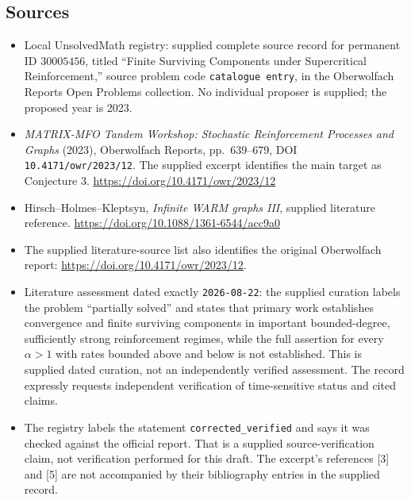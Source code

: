 \documentclass[11pt]{article}
\begin{document}
\subsection{Sources}
\begin{itemize}
\item Local UnsolvedMath registry: supplied complete source record for permanent ID \(30005456\), titled ``Finite Surviving Components under Supercritical Reinforcement,'' source problem code \texttt{catalogue entry}, in the Oberwolfach Reports Open Problems collection. No individual proposer is supplied; the proposed year is 2023.
\item \emph{MATRIX-MFO Tandem Workshop: Stochastic Reinforcement Processes and Graphs} (2023), Oberwolfach Reports, pp.\ 639--679, DOI \texttt{10.4171/owr/2023/12}. The supplied excerpt identifies the main target as Conjecture 3. \url{https://doi.org/10.4171/owr/2023/12}
\item Hirsch--Holmes--Kleptsyn, \emph{Infinite WARM graphs III}, supplied literature reference. \url{https://doi.org/10.1088/1361-6544/acc9a0}
\item The supplied literature-source list also identifies the original Oberwolfach report: \url{https://doi.org/10.4171/owr/2023/12}.
\item Literature assessment dated exactly \texttt{2026-08-22}: the supplied curation labels the problem ``partially solved'' and states that primary work establishes convergence and finite surviving components in important bounded-degree, sufficiently strong reinforcement regimes, while the full assertion for every \(\alpha>1\) with rates bounded above and below is not established. This is supplied dated curation, not an independently verified assessment. The record expressly requests independent verification of time-sensitive status and cited claims.
\item The registry labels the statement \texttt{corrected\_verified} and says it was checked against the official report. That is a supplied source-verification claim, not verification performed for this draft. The excerpt's references [3] and [5] are not accompanied by their bibliography entries in the supplied record.
\end{itemize}
\end{document}

